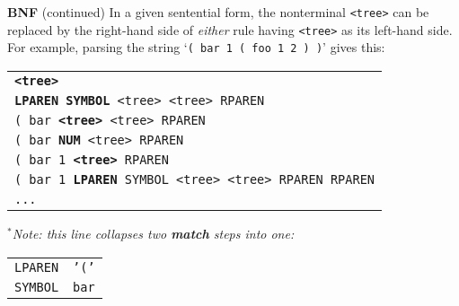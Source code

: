\begin{minipage}[t]{\sw}
\slidenumber
\LARGE
{\bf BNF} (continued)\exx
\emm{\LightBox{\MYtree}}\exx
In a given sentential form,
the nonterminal \verb'<tree>'
can be replaced by the right-hand side 
of {\em either} rule having \verb'<tree>' as its left-hand side.
For example, parsing the string `\verb'( bar 1 ( foo 1 2 ) )'' gives this:\exx
\emm%
\begin{tabular}{@{ $\Rightarrow$ }l}
\multicolumn{1}{l}{\tt{\bf <tree>}} \\
{\tt{\bf LPAREN SYMBOL} <tree> <tree> RPAREN} \\
{\tt ( bar {\bf <tree>} <tree> RPAREN}\hspace*{2em}{\em [$^*$see below...]}\\
{\tt ( bar {\bf NUM} <tree> RPAREN} \\
{\tt ( bar 1 {\bf <tree>} RPAREN} \\
{\tt ( bar 1 {\bf LPAREN} SYMBOL <tree> <tree> RPAREN RPAREN}\\
\verb'...' \\
\end{tabular}\exx
{\em $^*$Note: this line collapses two {\bf match} steps into one:}\exx
\emm%
\begin{tabular}{l@{ $\Rightarrow$ }l}
{\tt LPAREN} & {\tt '('} \\
{\tt SYMBOL} & {\tt bar} \\
\end{tabular}

\end{minipage}
\clearpage
